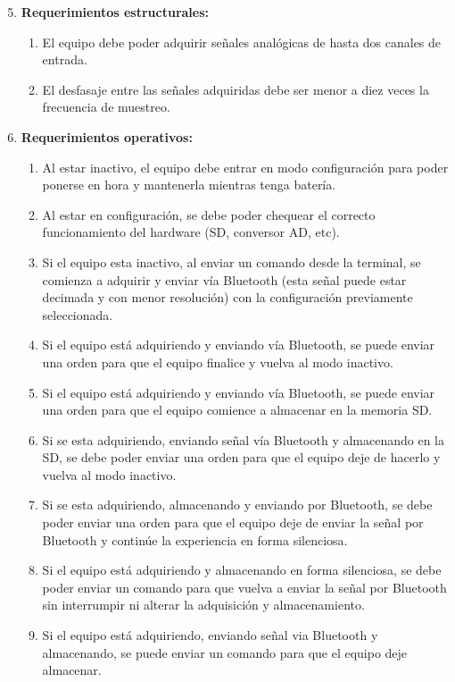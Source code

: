 \begin{enumerate}

	\setcounter{enumi}{4}

	\item \textbf{Requerimientos estructurales:} 
	\begin{enumerate}[label*=\arabic*.]
		\item El equipo debe poder adquirir señales analógicas de hasta dos canales de entrada.
		\item El desfasaje entre las señales adquiridas debe ser menor a diez veces la frecuencia de muestreo.
	\end{enumerate}
	
	\item \textbf{Requerimientos operativos:}
	\begin{enumerate}[label*=\arabic*.]
		\item Al estar inactivo, el equipo debe entrar en modo configuración para poder ponerse en hora y mantenerla mientras tenga batería.
		\item Al estar en configuración, se debe poder chequear el correcto funcionamiento del hardware (SD, conversor AD, etc).
		\item Si el equipo esta inactivo, al enviar un comando desde la terminal, se comienza a adquirir y enviar vía Bluetooth (esta señal puede estar decimada y con menor resolución) con la configuración previamente seleccionada.
		\item Si el equipo está adquiriendo y enviando vía Bluetooth, se puede enviar una orden para que el equipo finalice y vuelva al modo inactivo.
		\item Si el equipo está adquiriendo y enviando vía Bluetooth, se puede enviar una orden para que el equipo comience a almacenar en la memoria SD.
		\item Si se esta adquiriendo, enviando señal vía Bluetooth y almacenando en la SD, se debe poder enviar una orden para que el equipo deje de hacerlo y vuelva al modo inactivo.
		\item Si se esta adquiriendo, almacenando y enviando por Bluetooth, se debe poder enviar una orden para que el equipo deje de enviar la señal por Bluetooth y continúe la experiencia en forma silenciosa.
		\item Si el equipo está adquiriendo y almacenando en forma silenciosa, se debe poder enviar un comando para que vuelva a enviar la señal por Bluetooth sin interrumpir ni alterar la adquisición y almacenamiento.
		\item Si el equipo está adquiriendo, enviando señal via Bluetooth y almacenando, se puede enviar un comando para que el equipo deje almacenar.

\end{enumerate}
\end{enumerate}
